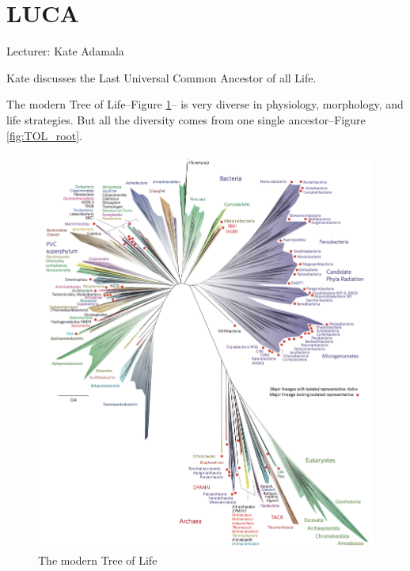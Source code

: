 \documentclass[]{article}
\begin{document}
\section{LUCA}

Lecturer: Kate Adamala

Kate discusses the Last Universal Common Ancestor of all Life.

The modern Tree of Life--Figure \ref{fig:TOL4}\cite{hug2016new}-- is very diverse in physiology, morphology, and life strategies. But all the diversity  comes from one single ancestor--Figure \ref{fig:TOL_root}.
\begin{figure}[H]
	\caption{The modern Tree of Life}\label{fig:TOL4}
	\includegraphics[width=\textwidth]{A_Novel_Representation_Of_The_Tree_Of_Life}
\end{figure}
\end{document}
